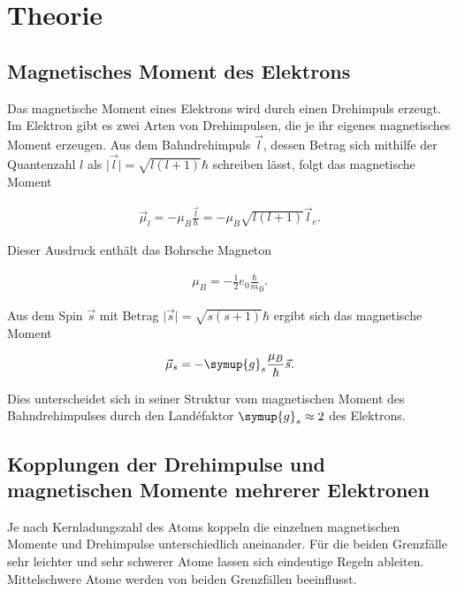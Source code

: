 \section{Theorie}
\label{sec:Theorie}


        \subsection{Magnetisches Moment des Elektrons}

            Das magnetische Moment eines Elektrons wird durch einen Drehimpuls erzeugt. 
            Im Elektron gibt es zwei Arten von Drehimpulsen, die je ihr eigenes magnetisches 
            Moment erzeugen. 
            Aus dem Bahndrehimpuls $\vec{l}$, dessen Betrag sich mithilfe der Quantenzahl 
            $l$ als $\lvert \vec{l}\rvert = \sqrt{l(l+1)}\hbar$ schreiben lässt, folgt das magnetische 
            Moment 

            \begin{align*}
                \vec{\mu}_l=-\mu_B\frac{\vec{l}}{\hbar} = -\mu_B \sqrt{l(l+1)}\vec{l}_e.
            \end{align*}

            Dieser Ausdruck enthält das Bohrsche Magneton 

            \begin{align*}
                \mu_B = -\frac12 e_0 \frac\hbar m_0.
            \end{align*}

            Aus dem Spin $\vec{s}$ mit Betrag $\lvert \vec{s}\rvert = \sqrt{s(s+1)}\hbar$ ergibt 
            sich das magnetische Moment

            \begin{align*}
                \vec{\mu}_s = -\symup{g}_s \frac{\mu_B}\hbar \vec{s}.
            \end{align*}

            Dies unterscheidet sich in seiner Struktur vom magnetischen Moment des Bahndrehimpulses 
            durch den Land\'{e}faktor $\symup{g}_s\approx 2$ des Elektrons.

        \subsection{Kopplungen der Drehimpulse und magnetischen Momente mehrerer Elektronen}

            Je nach Kernladungszahl des Atoms koppeln die einzelnen magnetischen Momente 
            und Drehimpulse unterschiedlich aneinander. Für die beiden Grenzfälle sehr leichter 
            und sehr schwerer Atome lassen sich eindeutige Regeln ableiten. Mittelschwere Atome 
            werden von beiden Grenzfällen beeinflusst. 

